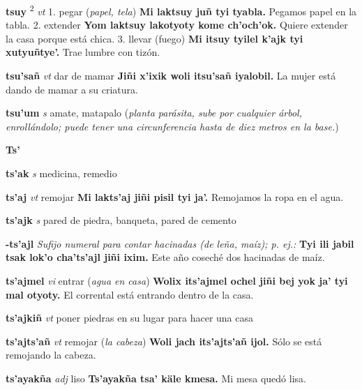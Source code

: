 \documentclass[10pt]{scrbook}
\newcommand{\entry}[1]{\textbf{#1}}
\newcommand{\alphaletter}[1]{\end{multicols}\addsec{#1}\begin{multicols}{2}}
\newcommand{\onedefinition}[1]{#1.}
\newcommand{\defsuperscript}[1]{\textsuperscript{#1}}
\newcommand{\nontranslationdef}[1]{\textit{#1}}
\newcommand{\partofspeech}[1]{\textit{#1}}
\newcommand{\spanishtranslation}[1]{#1}
\newcommand{\clarification}[1]{(\textit{#1})}
\newcommand{\cholexample}[1]{\textbf{#1}}
\newcommand{\exampletranslation}[1]{#1}
\begin{document}
\begin{multicols}{2}
\entry{tsuy}
\defsuperscript{2}
\partofspeech{vt}
\onedefinition{1}
\spanishtranslation{pegar}
\clarification{papel, tela}
\cholexample{Mi laktsuy juñ tyi tyabla.}
\exampletranslation{Pegamos papel en la tabla.}
\onedefinition{2}
\spanishtranslation{extender}
\cholexample{Yom laktsuy lakotyoty kome ch'och'ok.}
\exampletranslation{Quiere extender la casa porque está chica.}
\onedefinition{3}
\spanishtranslation{llevar (fuego)}
\cholexample{Mi itsuy tyilel k'ajk tyi xutyuñtye'.}
\exampletranslation{Trae lumbre con tizón.}

\entry{tsu'sañ}
\partofspeech{vt}
\spanishtranslation{dar de mamar}
\cholexample{Jiñi x'ixik woli itsu'sañ iyalobil.}
\exampletranslation{La mujer está dando de mamar a su criatura.}

\entry{tsu'um}
\partofspeech{s}
\spanishtranslation{amate, matapalo}
\clarification{planta parásita, sube por cualquier árbol, enrollándolo; puede tener una circunferencia hasta de diez metros en la base.}

\entry{Ts'}
\alphaletter{Ts'}

\entry{ts'ak}
\partofspeech{s}
\spanishtranslation{medicina, remedio}

\entry{ts'aj}
\partofspeech{vt}
\spanishtranslation{remojar}
\cholexample{Mi lakts'aj jiñi pisil tyi ja'.}
\exampletranslation{Remojamos la ropa en el agua.}

\entry{ts'ajk}
\partofspeech{s}
\spanishtranslation{pared de piedra, banqueta, pared de cemento}

\entry{-ts'ajl}
\nontranslationdef{Sufijo numeral para contar hacinadas (de leña, maíz); p. ej.:}
\cholexample{Tyi ili jabil tsak lok'o cha'ts'ajl jiñi ixim.}
\exampletranslation{Este año coseché dos hacinadas de maíz.}

\entry{ts'ajmel}
\partofspeech{vi}
\spanishtranslation{entrar}
\clarification{agua en casa}
\cholexample{Wolix its'ajmel ochel jiñi bej yok ja' tyi mal otyoty.}
\exampletranslation{El corrental está entrando dentro de la casa.}

\entry{ts'ajkiñ}
\partofspeech{vt}
\spanishtranslation{poner piedras en su lugar para hacer una casa}

\entry{ts'ajts'añ}
\partofspeech{vt}
\spanishtranslation{remojar}
\clarification{la cabeza}
\cholexample{Woli jach its'ajts'añ ijol.}
\exampletranslation{Sólo se está remojando la cabeza.}

\entry{ts'ayakña}
\partofspeech{adj}
\spanishtranslation{liso}
\cholexample{Ts'ayakña tsa' käle kmesa.}
\exampletranslation{Mi mesa quedó lisa.}


\end{multicols}
\end{document}
